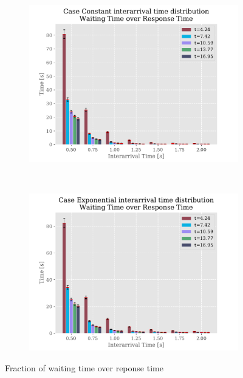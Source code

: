 \documentclass[a4paper,12pt]{article}
\begin{document}
\begin{figure}
  \centering
  \begin{subfigure}[b]{.45\textwidth}
    \includegraphics[width=\textwidth]{img/WaitingTimeOverResponseTimeP2Const.pdf}
    \label{fig:exp:const:wor}
  \end{subfigure}
  ~
  \begin{subfigure}[b]{.45\textwidth}
    \includegraphics[width=\textwidth]{img/WaitingTimeOverResponseTimeP2Exp.pdf}
    \label{fig:exp:exp:wor}
  \end{subfigure}
  \caption{Fraction of waiting time over reponse time}
  \label{fig:result-1}
\end{figure}
\end{document}
